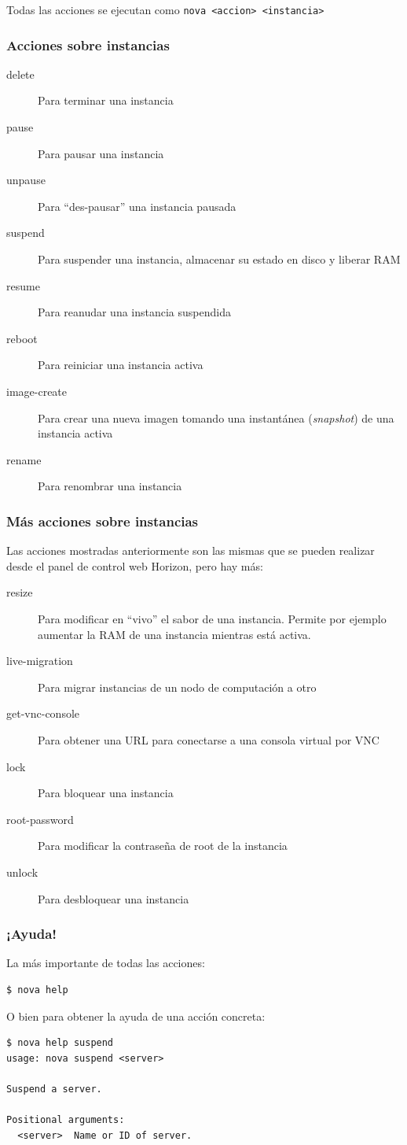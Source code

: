 \documentclass{beamer}
\begin{document}
\begin{frame}[fragile]
Todas las acciones se ejecutan como \texttt{nova <accion> <instancia>}
  \frametitle{Acciones sobre instancias}
  \begin{description}
  \item[delete] Para terminar una instancia
  \item[pause] Para pausar una instancia
  \item[unpause] Para ``des-pausar'' una instancia pausada
  \item[suspend] Para suspender una instancia, almacenar su estado en disco y
    liberar RAM
  \item[resume] Para reanudar una instancia suspendida
  \item[reboot] Para reiniciar una instancia activa
  \item[image-create] Para crear una nueva imagen tomando una instantánea
    (\textit{snapshot}) de una instancia activa
  \item[rename] Para renombrar una instancia
  \end{description}
\end{frame}

\begin{frame}
  \frametitle{Más acciones sobre instancias}
  Las acciones mostradas anteriormente son las mismas que se pueden realizar
  desde el panel de control web Horizon, pero hay más:
  \begin{description}
  \item[resize] Para modificar en ``vivo'' el sabor de una instancia. Permite
    por ejemplo aumentar la RAM de una instancia mientras está activa.
  \item[live-migration] Para migrar instancias de un nodo de computación a otro
  \item[get-vnc-console] Para obtener una URL para conectarse a una consola
    virtual por VNC
  \item[lock] Para bloquear una instancia
  \item[root-password] Para modificar la contraseña de root de la instancia
  \item[unlock] Para desbloquear una instancia
  \end{description}
\end{frame}

\begin{frame}[fragile]
  \frametitle{¡Ayuda!}
  La más importante de todas las acciones:
  \begin{lstlisting}[style=consola]
$ nova help
  \end{lstlisting}
  O bien para obtener la ayuda de una acción concreta:
  \begin{lstlisting}[style=consola]
$ nova help suspend
usage: nova suspend <server>
   
Suspend a server.
    
Positional arguments:
  <server>  Name or ID of server.
  \end{lstlisting}
\end{frame}
\end{document}
